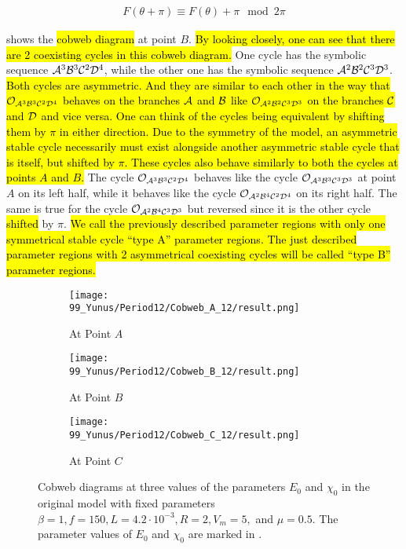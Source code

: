 \begin{align}
	F(\theta + \pi) \equiv F(\theta) + \pi \mod 2\pi \label{equ:state.os.sym}
\end{align}

 shows the \hl{cobweb diagram} at point $B$.
\hl{By looking closely, one can see that there are 2 coexisting cycles in this cobweb diagram.}
One cycle has the symbolic sequence $\mathcal{A}^3\mathcal{B}^3\mathcal{C}^2\mathcal{D}^4$, while the other one has the symbolic sequence $\mathcal{A}^2\mathcal{B}^2\mathcal{C}^3\mathcal{D}^3$.
\hl{
	Both cycles are asymmetric.
	And they are similar to each other in the way that $\mathcal{O}_{\mathcal{A}^3\mathcal{B}^3\mathcal{C}^2\mathcal{D}^4}$ behaves on the branches $\mathcal{A}$ and $\mathcal{B}$ like $\mathcal{O}_{\mathcal{A}^2\mathcal{B}^2\mathcal{C}^3\mathcal{D}^3}$ on the branches $\mathcal{C}$ and $\mathcal{D}$ and vice versa.
	One can think of the cycles being equivalent by shifting them by $\pi$ in either direction.
	Due to the symmetry of the model, an asymmetric stable cycle necessarily must exist alongside another asymmetric stable cycle that is itself, but shifted by $\pi$.
	These cycles also behave similarly to both the cycles at points $A$ and $B$.
}
The cycle $\mathcal{O}_{\mathcal{A}^3\mathcal{B}^3\mathcal{C}^2\mathcal{D}^4}$ behaves like the cycle $\mathcal{O}_{\mathcal{A}^3\mathcal{B}^3\mathcal{C}^3\mathcal{D}^3}$ at point $A$ on its left half, while it behaves like the cycle $\mathcal{O}_{\mathcal{A}^2\mathcal{B}^4\mathcal{C}^2\mathcal{D}^4}$ on its right half.
The same is true for the cycle $\mathcal{O}_{\mathcal{A}^2\mathcal{B}^4\mathcal{C}^3\mathcal{D}^3}$ but reversed since it is the other cycle \hl{shifted} by $\pi$.
\hl{
	We call the previously described parameter regions with only one symmetrical stable cycle ``type A'' parameter regions.
	The just described parameter regions with 2 asymmetrical coexisting cycles will be called ``type B'' parameter regions.
}

\begin{figure}
	\centering
	\begin{subfigure}{0.3\textwidth}
		\centering
		\texttt{[image: 99\_Yunus/Period12/Cobweb\_A\_12/result.png]}
		\caption{At Point $A$}
		\label{fig:yunus.2pi.CobwebA12}
	\end{subfigure}
	\begin{subfigure}{0.3\textwidth}
		\centering
		\texttt{[image: 99\_Yunus/Period12/Cobweb\_B\_12/result.png]}
		\caption{At Point $B$}
		\label{fig:yunus.2pi.CobwebB12}
	\end{subfigure}
	\begin{subfigure}{0.3\textwidth}
		\centering
		\texttt{[image: 99\_Yunus/Period12/Cobweb\_C\_12/result.png]}
		\caption{At Point $C$}
		\label{fig:yunus.2pi.CobwebC12}
	\end{subfigure}
	\caption[Cobweb diagrams of the original model]{
		Cobweb diagrams at three values of the parameters $E_0$ and $\chi_0$ in the original model with fixed parameters $\beta = 1, f = 150, L = 4.2 \cdot 10^{-3}, R = 2, V_m = 5,$ and $\mu = 0.5$.
		The parameter values of $E_0$ and $\chi_0$ are marked in .
	}
\end{figure}

